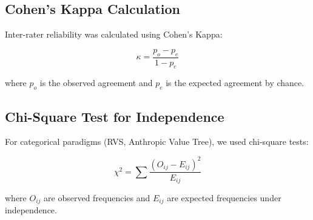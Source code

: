 \subsection{Cohen's Kappa Calculation}
Inter-rater reliability was calculated using Cohen's Kappa:

\[
\kappa = \frac{p_o - p_e}{1 - p_e}
\]

where $p_o$ is the observed agreement and $p_e$ is the expected agreement by chance.

\subsection{Chi-Square Test for Independence}
For categorical paradigms (RVS, Anthropic Value Tree), we used chi-square tests:

\[
\chi^2 = \sum \frac{(O_{ij} - E_{ij})^2}{E_{ij}}
\]

where $O_{ij}$ are observed frequencies and $E_{ij}$ are expected frequencies under independence.